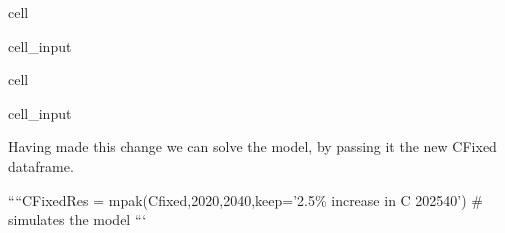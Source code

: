 \documentclass[letterpaper,10pt,english]{jupyterBook}
\begin{document}
\begin{sphinxuseclass}{cell}\begin{sphinxVerbatimInput}

\begin{sphinxuseclass}{cell_input}
\begin{sphinxVerbatim}[commandchars=\\\{\}]
 
\end{sphinxVerbatim}

\end{sphinxuseclass}\end{sphinxVerbatimInput}

\end{sphinxuseclass}
\begin{sphinxuseclass}{cell}\begin{sphinxVerbatimInput}

\begin{sphinxuseclass}{cell_input}
\begin{sphinxVerbatim}[commandchars=\\\{\}]
\end{sphinxVerbatim}

\end{sphinxuseclass}\end{sphinxVerbatimInput}

\end{sphinxuseclass}
\sphinxAtStartPar
Having made this change we can solve the model, by passing it the new CFixed dataframe.

\sphinxAtStartPar
````CFixedRes = mpak(Cfixed,2020,2040,keep=’2.5\% increase in C 2025\sphinxhyphen{}40’) \# simulates the model ```
\end{document}

